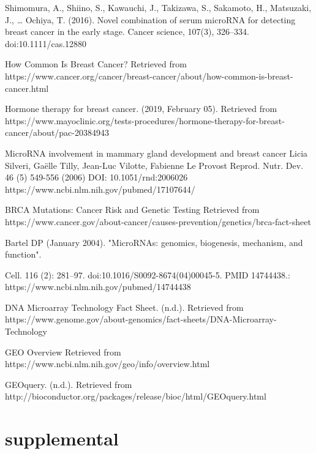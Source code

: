 \documentclass{bioinfo}
\begin{document}
\begin{thebibliography}{}
 Shimomura, A., Shiino, S., Kawauchi, J., Takizawa, S., Sakamoto, H., Matsuzaki, J., … Ochiya, T. (2016). Novel combination of serum microRNA for detecting breast cancer in the early stage. Cancer science, 107(3), 326–334. doi:10.1111/cas.12880

 How Common Is Breast Cancer? Retrieved from https://www.cancer.org/cancer/breast-cancer/about/how-common-is-breast-cancer.html

 Hormone therapy for breast cancer. (2019, February 05). 
Retrieved from https://www.mayoclinic.org/tests-procedures/hormone-therapy-for-breast-cancer/about/pac-20384943


 MicroRNA involvement in mammary gland development and breast cancer
Licia Silveri, Gaëlle Tilly, Jean-Luc Vilotte, Fabienne Le Provost
Reprod. Nutr. Dev. 46 (5) 549-556 (2006)
DOI: 10.1051/rnd:2006026
https://www.ncbi.nlm.nih.gov/pubmed/17107644/

 BRCA Mutations: Cancer Risk and Genetic Testing Retrieved from https://www.cancer.gov/about-cancer/causes-prevention/genetics/brca-fact-sheet



 Bartel DP (January 2004). "MicroRNAs: genomics, biogenesis, mechanism, and function". 

Cell. 116 (2): 281–97. doi:10.1016/S0092-8674(04)00045-5. PMID 14744438.: 
https://www.ncbi.nlm.nih.gov/pubmed/14744438


 DNA Microarray Technology Fact Sheet. (n.d.). Retrieved from https://www.genome.gov/about-genomics/fact-sheets/DNA-Microarray-Technology

 GEO Overview  Retrieved from https://www.ncbi.nlm.nih.gov/geo/info/overview.html

 GEOquery. (n.d.). Retrieved from http://bioconductor.org/packages/release/bioc/html/GEOquery.html

\end{thebibliography}


\section{supplemental}
\end{document}
